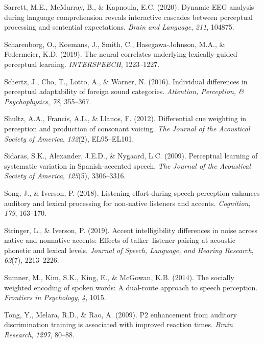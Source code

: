 \documentclass[
  12pt,
  twoside]{article}
\newlength{\cslhangindent}
\newlength{\cslentryspacingunit} %
\newenvironment{CSLReferences}[2] %
 {%
  \setlength{\parindent}{0pt}
  \ifodd #1
  \let\oldpar\par
  \def\par{\hangindent=\cslhangindent\oldpar}
  \fi
  \setlength{\parskip}{#2\cslentryspacingunit}
 }%
 {}
\begin{document}
\begin{CSLReferences}{1}{0}
\leavevmode{}%
Sarrett, M.E., McMurray, B., \& Kapnoula, E.C. (2020). Dynamic {EEG} analysis during language comprehension reveals interactive cascades between perceptual processing and sentential expectations. \emph{Brain and Language}, \emph{211}, 104875.

\leavevmode{}%
Scharenborg, O., Koemans, J., Smith, C., Hasegawa-Johnson, M.A., \& Federmeier, K.D. (2019). The neural correlates underlying lexically-guided perceptual learning. \emph{INTERSPEECH}, 1223--1227.

\leavevmode{}%
Schertz, J., Cho, T., Lotto, A., \& Warner, N. (2016). Individual differences in perceptual adaptability of foreign sound categories. \emph{Attention, Perception, \& Psychophysics}, \emph{78}, 355--367.

\leavevmode{}%
Shultz, A.A., Francis, A.L., \& Llanos, F. (2012). Differential cue weighting in perception and production of consonant voicing. \emph{The Journal of the Acoustical Society of America}, \emph{132}(2), EL95--EL101.

\leavevmode{}%
Sidaras, S.K., Alexander, J.E.D., \& Nygaard, L.C. (2009). Perceptual learning of systematic variation in {Spanish-accented} speech. \emph{The Journal of the Acoustical Society of America}, \emph{125}(5), 3306--3316.

\leavevmode{}%
Song, J., \& Iverson, P. (2018). Listening effort during speech perception enhances auditory and lexical processing for non-native listeners and accents. \emph{Cognition}, \emph{179}, 163--170.

\leavevmode{}%
Stringer, L., \& Iverson, P. (2019). Accent intelligibility differences in noise across native and nonnative accents: Effects of talker--listener pairing at acoustic--phonetic and lexical levels. \emph{Journal of Speech, Language, and Hearing Research}, \emph{62}(7), 2213--2226.

\leavevmode{}%
Sumner, M., Kim, S.K., King, E., \& McGowan, K.B. (2014). The socially weighted encoding of spoken words: A dual-route approach to speech perception. \emph{Frontiers in Psychology}, \emph{4}, 1015.

\leavevmode{}%
Tong, Y., Melara, R.D., \& Rao, A. (2009). P2 enhancement from auditory discrimination training is associated with improved reaction times. \emph{Brain Research}, \emph{1297}, 80--88.


\end{CSLReferences}
\end{document}

